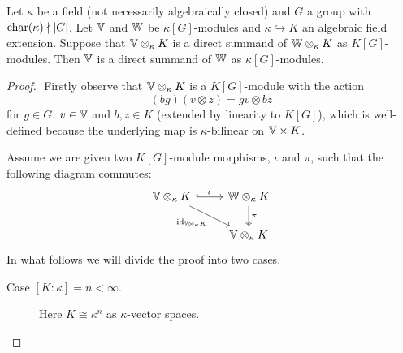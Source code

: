 \begin{thm}\label{thm:direct-summands-under-field-extensions}
    Let\/ $\kappa$ be a field (not necessarily algebraically closed) and\/ $G$ a group with\/ $\operatorname{char}(\kappa)\nmid|G|$. Let\/ $\mathbb V$ and\/ $\mathbb W$ be\/ $\kappa[G]$-modules and $\kappa\hookrightarrow K$ an algebraic field extension. Suppose that\/ $\mathbb V\otimes_\kappa K$ is a direct summand of\/ $\mathbb W\otimes_\kappa K$ as\/ $K[G]$-modules. Then\/ $\mathbb V$ is a direct summand of\/ $\mathbb W$ as\/ $\kappa[G]$-modules.
\end{thm}

\begin{proof}${}$
    Firstly observe that $\mathbb V\otimes_\kappa K$ is a $K[G]$-module with the action
    \begin{equation}\label{eq:extended-action}
        (bg)(v\otimes z) = gv\otimes bz
    \end{equation}
    for $g\in G$, $v\in\mathbb V$ and $b,z\in K$ (extended by linearity to $K[G]$), which is well-defined because the underlying map is $\kappa$-bilinear on $\mathbb V\times K$.
    
    Assume we are given two $K[G]$-module morphisms, $\iota$ and $\pi$, such that the following diagram commutes:
    $$
        \begin{tikzcd}
            \V\otimes_\kappa K
                    \arrow[r,"\iota",hook]
                    \arrow[rd,"\id_{\V\otimes_\kappa K}"']
                &\W\otimes_\kappa K
                    \arrow[d,"\pi",two heads]\\
                &\V\otimes_\kappa K
        \end{tikzcd}
    $$
    In what follows we will divide the proof into two cases.
    \begin{description}
        \item[Case ${[K:\kappa]}=n<\infty$.] Here $K\cong\kappa^n$ as $\kappa$-vector spaces.
        

\end{description}
\end{proof}
